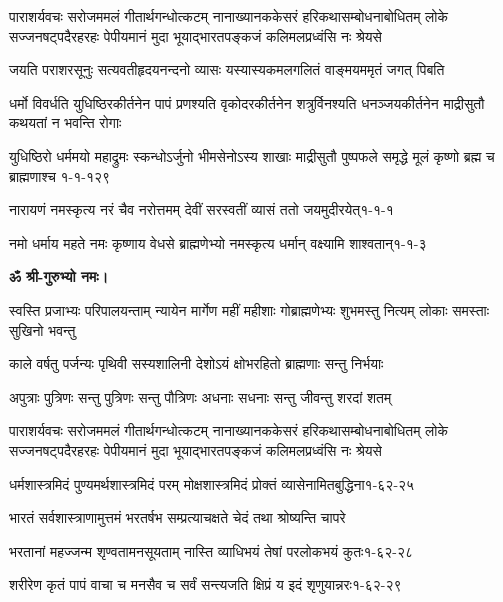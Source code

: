 \fourlineindentedshloka
{पाराशर्यवचः सरोजममलं गीतार्थगन्धोत्कटम्}
{नानाख्यानककेसरं हरिकथासम्बोधनाबोधितम्}
{लोके सज्जनषट्पदैरहरहः पेपीयमानं मुदा}
{भूयाद्भारतपङ्कजं कलिमलप्रध्वंसि नः श्रेयसे}

\twolineshloka
{जयति पराशरसूनुः सत्यवतीहृदयनन्दनो व्यासः}
{यस्यास्यकमलगलितं वाङ्मयममृतं जगत् पिबति}


\fourlineindentedshloka
{धर्मो विवर्धति युधिष्ठिरकीर्तनेन}
{पापं प्रणश्यति वृकोदरकीर्तनेन}
{शत्रुर्विनश्यति धनञ्जयकीर्तनेन}
{माद्रीसुतौ कथयतां न भवन्ति रोगाः}

\annofourlineindentedshloka
{युधिष्ठिरो धर्ममयो महाद्रुमः}
{स्कन्धोऽर्जुनो भीमसेनोऽस्य शाखाः}
{माद्रीसुतौ पुष्पफले समृद्धे}
{मूलं कृष्णो ब्रह्म च ब्राह्मणाश्च}
{१-१-१२९}

\annotwolineshloka
{नारायणं नमस्कृत्य नरं चैव नरोत्तमम्}
{देवीं सरस्वतीं व्यासं ततो जयमुदीरयेत्}{१-१-१}

\annotwolineshloka
{नमो धर्माय महते नमः कृष्णाय वेधसे}
{ब्राह्मणेभ्यो नमस्कृत्य धर्मान् वक्ष्यामि शाश्वतान्}{१-१-३}


\resetShloka
\centerline{\textbf{ॐ श्री-गुरुभ्यो नमः।}}

\resetShloka
{}

\fourlineindentedshloka
{स्वस्ति प्रजाभ्यः परिपालयन्ताम्}
{न्यायेन मार्गेण महीं महीशाः}
{गोब्राह्मणेभ्यः शुभमस्तु नित्यम्}
{लोकाः समस्ताः सुखिनो भवन्तु}

\twolineshloka
{काले वर्षतु पर्जन्यः पृथिवी सस्यशालिनी}
{देशोऽयं क्षोभरहितो ब्राह्मणाः सन्तु निर्भयाः}

\twolineshloka
{अपुत्राः पुत्रिणः सन्तु पुत्रिणः सन्तु पौत्रिणः}
{अधनाः सधनाः सन्तु जीवन्तु शरदां शतम्}

\fourlineindentedshloka
{पाराशर्यवचः सरोजममलं गीतार्थगन्धोत्कटम्}
{नानाख्यानककेसरं हरिकथासम्बोधनाबोधितम्}
{लोके सज्जनषट्पदैरहरहः पेपीयमानं मुदा}
{भूयाद्भारतपङ्कजं कलिमलप्रध्वंसि नः श्रेयसे}



\annotwolineshloka
{धर्मशास्त्रमिदं पुण्यमर्थशास्त्रमिदं परम्}
{मोक्षशास्त्रमिदं प्रोक्तं व्यासेनामितबुद्धिना}{१-६२-२५}

\twolineshloka
{भारतं सर्वशास्त्राणामुत्तमं भरतर्षभ}
{सम्प्रत्याचक्षते चेदं तथा श्रोष्यन्ति चापरे}

\annotwolineshloka
{भरतानां महज्जन्म शृण्वतामनसूयताम्}
{नास्ति व्याधिभयं तेषां परलोकभयं कुतः}{१-६२-२८}

\annotwolineshloka
{शरीरेण कृतं पापं वाचा च मनसैव च}
{सर्वं सन्त्यजति क्षिप्रं य इदं शृणुयान्नरः}{१-६२-२९}

